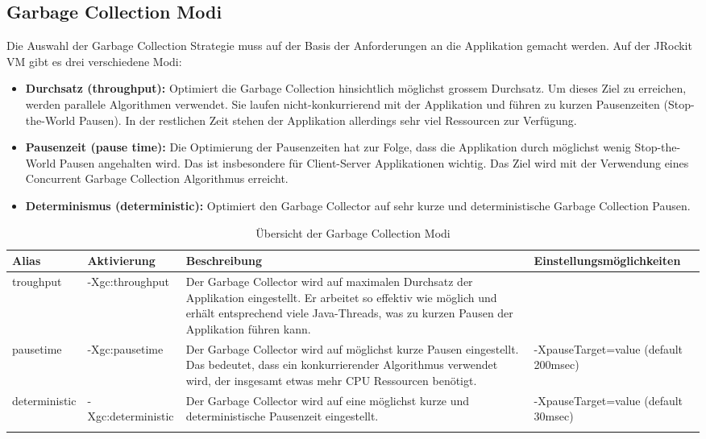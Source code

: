 \subsection{Garbage Collection Modi}
Die Auswahl der Garbage Collection Strategie muss auf der Basis der Anforderungen an die Applikation gemacht werden. Auf der JRockit VM gibt es drei verschiedene Modi:
\begin{itemize}
	\item \textbf{Durchsatz (throughput):} Optimiert die Garbage Collection hinsichtlich möglichst grossem Durchsatz. Um dieses Ziel zu erreichen, werden parallele Algorithmen verwendet. Sie laufen nicht-konkurrierend mit der Applikation und führen zu kurzen Pausenzeiten (Stop-the-World Pausen). In der restlichen Zeit stehen der Applikation allerdings sehr viel Ressourcen zur Verfügung.
	\item \textbf{Pausenzeit (pause time):} Die Optimierung der Pausenzeiten hat zur Folge, dass die Applikation durch möglichst wenig Stop-the-World Pausen angehalten wird. Das ist insbesondere für Client-Server Applikationen wichtig. Das Ziel wird mit der Verwendung eines Concurrent Garbage Collection Algorithmus erreicht.
	\item \textbf{Determinismus (deterministic):} Optimiert den Garbage Collector auf sehr kurze und deterministische Garbage Collection Pausen.  
\end{itemize}
  \begin{longtable}{|p{2.5cm}|p{3.1cm}|p{4.5cm}|p{4cm}|}\hline
  \textbf{Alias} & \textbf{Aktivierung} & \textbf{Beschreibung} & Einstellungsmöglichkeiten\\\hline
  troughput & -Xgc:throughput & Der Garbage Collector wird auf maximalen Durchsatz der Applikation eingestellt. Er arbeitet so effektiv wie möglich und erhält entsprechend viele Java-Threads, was zu kurzen Pausen der Applikation führen kann. & \\\hline
  pausetime & -Xgc:pausetime & Der Garbage Collector wird auf möglichst kurze Pausen eingestellt. Das bedeutet, dass ein konkurrierender Algorithmus verwendet wird, der insgesamt etwas mehr CPU Ressourcen benötigt. & -XpauseTarget=value (default 200msec)\\\hline
  deterministic & -Xgc:deterministic & Der Garbage Collector wird auf eine möglichst kurze und deterministische Pausenzeit eingestellt. &-XpauseTarget=value (default 30msec)\\\hline
    \caption{Übersicht der Garbage Collection Modi}
\end{longtable}

